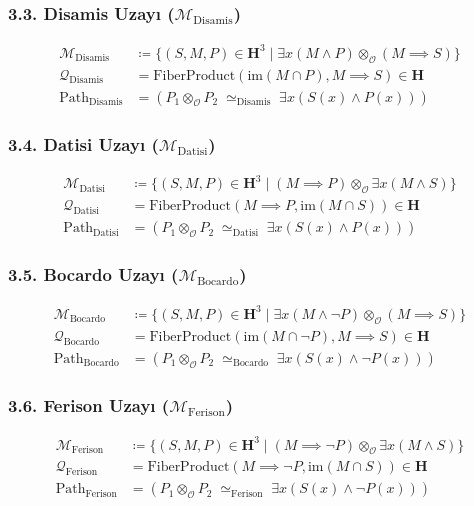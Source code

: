 \documentclass[11pt, a4paper]{article}
\begin{document}
\subsubsection{3.3. Disamis Uzayı ($\mathcal{M}_{\text{Disamis}}$)}
\begin{align}
\mathcal{M}_{\text{Disamis}} &\coloneqq \{ (S, M, P) \in \mathbf{H}^3 \mid \exists x (M \land P) \otimes_{\mathcal{O}} (M \implies S) \} \\
\mathcal{Q}_{\text{Disamis}} &= \text{FiberProduct}(\text{im}(M \cap P), M \implies S) \in \mathbf{H} \\
\text{Path}_{\text{Disamis}} &= (P_1 \otimes_{\mathcal{O}} P_2 \;\simeq_{\text{Disamis}}\; \exists x (S(x) \land P(x)))
\end{align}

\subsubsection{3.4. Datisi Uzayı ($\mathcal{M}_{\text{Datisi}}$)}
\begin{align}
\mathcal{M}_{\text{Datisi}} &\coloneqq \{ (S, M, P) \in \mathbf{H}^3 \mid (M \implies P) \otimes_{\mathcal{O}} \exists x (M \land S) \} \\
\mathcal{Q}_{\text{Datisi}} &= \text{FiberProduct}(M \implies P, \text{im}(M \cap S)) \in \mathbf{H} \\
\text{Path}_{\text{Datisi}} &= (P_1 \otimes_{\mathcal{O}} P_2 \;\simeq_{\text{Datisi}}\; \exists x (S(x) \land P(x)))
\end{align}

\subsubsection{3.5. Bocardo Uzayı ($\mathcal{M}_{\text{Bocardo}}$)}
\begin{align}
\mathcal{M}_{\text{Bocardo}} &\coloneqq \{ (S, M, P) \in \mathbf{H}^3 \mid \exists x (M \land \neg P) \otimes_{\mathcal{O}} (M \implies S) \} \\
\mathcal{Q}_{\text{Bocardo}} &= \text{FiberProduct}(\text{im}(M \cap \neg P), M \implies S) \in \mathbf{H} \\
\text{Path}_{\text{Bocardo}} &= (P_1 \otimes_{\mathcal{O}} P_2 \;\simeq_{\text{Bocardo}}\; \exists x (S(x) \land \neg P(x)))
\end{align}

\subsubsection{3.6. Ferison Uzayı ($\mathcal{M}_{\text{Ferison}}$)}
\begin{align}
\mathcal{M}_{\text{Ferison}} &\coloneqq \{ (S, M, P) \in \mathbf{H}^3 \mid (M \implies \neg P) \otimes_{\mathcal{O}} \exists x (M \land S) \} \\
\mathcal{Q}_{\text{Ferison}} &= \text{FiberProduct}(M \implies \neg P, \text{im}(M \cap S)) \in \mathbf{H} \\
\text{Path}_{\text{Ferison}} &= (P_1 \otimes_{\mathcal{O}} P_2 \;\simeq_{\text{Ferison}}\; \exists x (S(x) \land \neg P(x)))
\end{align}
\end{document}
